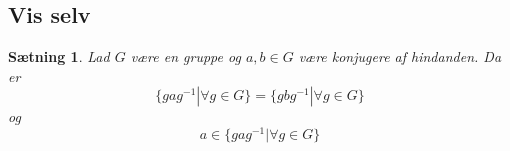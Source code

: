 \documentclass{article}
\newcommand{\inv}{^{-1}}
\newcommand{\ud}[1]{}
\newtheorem{setn}{Sætning}
\newtheorem{defi}{Definition}
\begin{document}
		\subsection*{Vis selv}
		\begin{setn} \label{KonjPar}
			Lad $G$ være en gruppe og $a,b \in G$ være konjugere af hindanden.
			Da er
			$$\{gag\inv | \forall g \in G\} = \{gbg\inv | \forall g \in G\}$$
			og
			$$a \in \{gag\inv | \forall g \in G\}$$
		\end{setn}

	\ud{
		\subsection*{Opsamling}
		\subsection*{Definitioner}
		\subsection*{Sætninger}
		\subsection*{Vis selv}
	\section*{Til senere}
		\begin{defi}
			En tupel $(R,+,\cdot)$ med en mængde $R$ og binære operationer $+, \cdot$
			kaldes en ring hvis:

			(1) $(R,+)$ er en gruppe hvor neutral elementet kaldes $0$.

			(2) $\cdot$ er en acosiativ operation.

			(3) $\cdot$ distribuere over $+$ alstå $\forall a,b,c \in R: a*(b+c)=a*b+a*c$
			og $(a+b)*c = a*c+b*c$.
		\end{defi}
	\section*{Til senere}
	}
\end{document}
